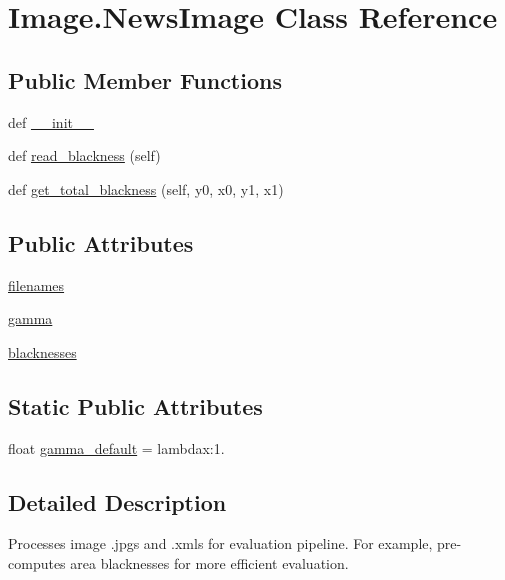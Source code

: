 \hypertarget{class_image_1_1_news_image}{}\section{Image.\+News\+Image Class Reference}
\label{class_image_1_1_news_image}
\subsection*{Public Member Functions}
\begin{DoxyCompactItemize}
\item 
def \hyperlink{class_image_1_1_news_image_ac60fe6a3f9934c3322cf9104310d47d6}{\+\_\+\+\_\+init\+\_\+\+\_\+}
\item 
def \hyperlink{class_image_1_1_news_image_adb7e859d7c2d3b7dcd2edc896a096271}{read\+\_\+blackness} (self)
\item 
def \hyperlink{class_image_1_1_news_image_adf431bcb54522e953ddbfb0434819c2a}{get\+\_\+total\+\_\+blackness} (self, y0, x0, y1, x1)
\end{DoxyCompactItemize}
\subsection*{Public Attributes}
\begin{DoxyCompactItemize}
\item 
\hyperlink{class_image_1_1_news_image_a06ed52c09d35dc9f686700d84899272f}{filenames}
\item 
\hyperlink{class_image_1_1_news_image_aed7a1f3b80ca73bb1867c098482af805}{gamma}
\item 
\hyperlink{class_image_1_1_news_image_aa9aad9dbe0ef29d923b8f89ae7e4071d}{blacknesses}
\end{DoxyCompactItemize}
\subsection*{Static Public Attributes}
\begin{DoxyCompactItemize}
\item 
float \hyperlink{class_image_1_1_news_image_a81f48b978e2fd5b4e2880e1719d4349e}{gamma\+\_\+default} = lambdax\+:1.
\end{DoxyCompactItemize}


\subsection{Detailed Description}
\begin{DoxyVerb}Processes image .jpgs and .xmls for evaluation pipeline.
   For example, pre-computes area blacknesses for more efficient
   evaluation.
\end{DoxyVerb}
 

